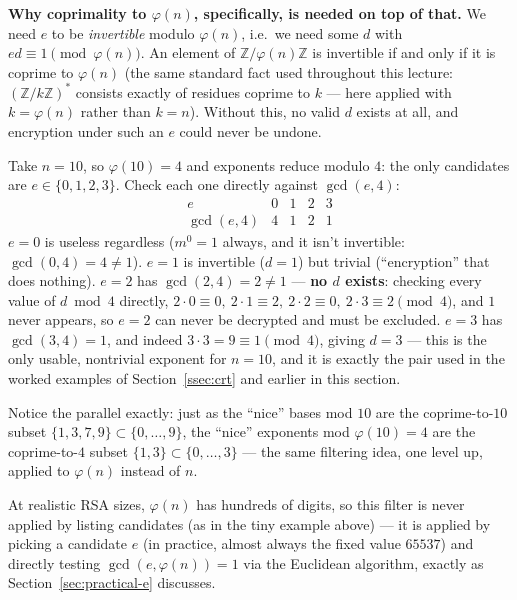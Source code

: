\begin{remark}[Why $\gcd(e,\varphi(n))=1$ is required — and why this is a completely different condition from $\gcd(a,n)=1$]
\medskip\noindent\textbf{Why coprimality to $\varphi(n)$, specifically, is needed on top of that.} We need $e$ to be \emph{invertible} modulo $\varphi(n)$, i.e.\ we need some $d$ with $ed \equiv 1 \pmod{\varphi(n)}$. An element of $\mathbb{Z}/\varphi(n)\mathbb{Z}$ is invertible if and only if it is coprime to $\varphi(n)$ (the same standard fact used throughout this lecture: $(\mathbb{Z}/k\mathbb{Z})^{*}$ consists exactly of residues coprime to $k$ — here applied with $k=\varphi(n)$ rather than $k=n$). Without this, no valid $d$ exists at all, and encryption under such an $e$ could never be undone.

\begin{example}[The filter, made fully concrete on $n=10$]
Take $n=10$, so $\varphi(10)=4$ and exponents reduce modulo $4$: the only candidates are $e\in\{0,1,2,3\}$. Check each one directly against $\gcd(e,4)$:
\[
\begin{array}{c|cccc}
e & 0 & 1 & 2 & 3\\
\hline
\gcd(e,4) & 4 & 1 & 2 & 1
\end{array}
\]
$e=0$ is useless regardless ($m^0=1$ always, and it isn't invertible: $\gcd(0,4)=4\ne1$). $e=1$ is invertible ($d=1$) but trivial (``encryption'' that does nothing). $e=2$ has $\gcd(2,4)=2\ne1$ — \textbf{no $d$ exists}: checking every value of $d\bmod4$ directly, $2\cdot0\equiv0,\ 2\cdot1\equiv2,\ 2\cdot2\equiv0,\ 2\cdot3\equiv2\pmod4$, and $1$ never appears, so $e=2$ can never be decrypted and must be excluded. $e=3$ has $\gcd(3,4)=1$, and indeed $3\cdot3=9\equiv1\pmod4$, giving $d=3$ — this is the only usable, nontrivial exponent for $n=10$, and it is exactly the pair used in the worked examples of Section~\ref{ssec:crt} and earlier in this section.

Notice the parallel exactly: just as the ``nice'' bases mod $10$ are the coprime-to-$10$ subset $\{1,3,7,9\}\subset\{0,\dots,9\}$, the ``nice'' exponents mod $\varphi(10)=4$ are the coprime-to-$4$ subset $\{1,3\}\subset\{0,\dots,3\}$ — the same filtering idea, one level up, applied to $\varphi(n)$ instead of $n$.
\end{example}

At realistic RSA sizes, $\varphi(n)$ has hundreds of digits, so this filter is never applied by listing candidates (as in the tiny example above) — it is applied by picking a candidate $e$ (in practice, almost always the fixed value $65537$) and directly testing $\gcd(e,\varphi(n))=1$ via the Euclidean algorithm, exactly as Section~\ref{sec:practical-e} discusses.
\end{remark}


